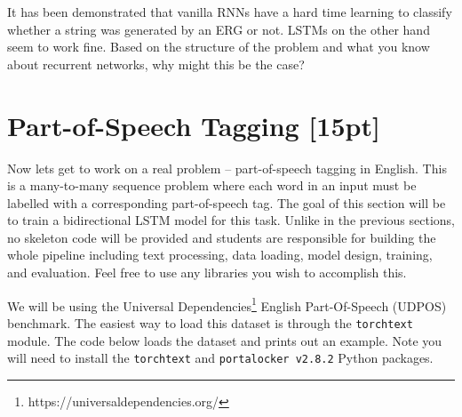\documentclass[a4paper,10pt]{article}
\begin{document}
\vspace{5pt}
\begin{taskbox}
 It has been demonstrated that vanilla RNNs have a hard time learning to classify whether a string was generated by an ERG or not. LSTMs on the other hand seem to work fine. Based on the structure of the problem and what you know about recurrent networks, why might this be the case? 
\end{taskbox}
\vspace{5pt}

\section{Part-of-Speech Tagging [15pt]}
Now lets get to work on a real problem -- part-of-speech tagging in English. This is a many-to-many sequence problem where each word in an input must be labelled with a corresponding part-of-speech tag. The goal of this section will be to train a bidirectional LSTM model for this task. Unlike in the previous sections, no skeleton code will be provided and students are responsible for building the whole pipeline including text processing, data loading, model design, training, and evaluation. Feel free to use any libraries you wish to accomplish this.

We will be using the Universal Dependencies\footnote{https://universaldependencies.org/} English Part-Of-Speech (UDPOS) benchmark. The easiest way to load this dataset is through the \texttt{torchtext} module. The code below loads the dataset and prints out an example. Note you will need to install the \texttt{torchtext} and \texttt{portalocker v2.8.2} Python packages.
\end{document}
